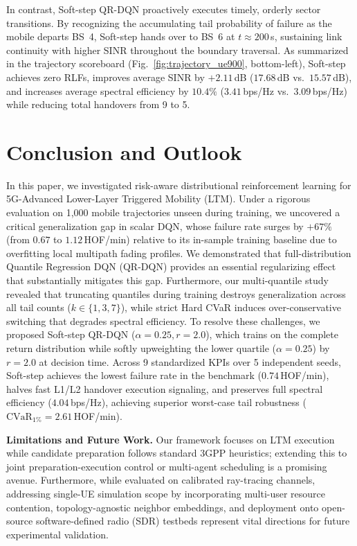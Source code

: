 \documentclass{ieeetmlcn}
\begin{document}
In contrast, Soft-step QR-DQN proactively executes timely, orderly sector transitions. By recognizing the accumulating tail probability of failure as the mobile departs BS~4, Soft-step hands over to BS~6 at $t \approx 200$\,s, sustaining link continuity with higher SINR throughout the boundary traversal. As summarized in the trajectory scoreboard (Fig.~\ref{fig:trajectory_ue900}, bottom-left), Soft-step achieves zero RLFs, improves average SINR by $+2.11$\,dB ($17.68$\,dB vs.\ $15.57$\,dB), and increases average spectral efficiency by $10.4\%$ ($3.41$\,bps/Hz vs.\ $3.09$\,bps/Hz) while reducing total handovers from 9 to 5.



\section{Conclusion and Outlook}
\label{sec:conclusion}
In this paper, we investigated risk-aware distributional reinforcement learning for 5G-Advanced Lower-Layer Triggered Mobility (LTM). Under a rigorous evaluation on 1,000 mobile trajectories unseen during training, we uncovered a critical generalization gap in scalar DQN, whose failure rate surges by $+67\%$ (from $0.67$ to $1.12$\,HOF/min) relative to its in-sample training baseline due to overfitting local multipath fading profiles. We demonstrated that full-distribution Quantile Regression DQN (QR-DQN) provides an essential regularizing effect that substantially mitigates this gap. Furthermore, our multi-quantile study revealed that truncating quantiles during training destroys generalization across all tail counts ($k \in \{1, 3, 7\}$), while strict Hard CVaR induces over-conservative switching that degrades spectral efficiency. To resolve these challenges, we proposed Soft-step QR-DQN ($\alpha=0.25, r=2.0$), which trains on the complete return distribution while softly upweighting the lower quartile ($\alpha=0.25$) by $r=2.0$ at decision time. Across 9 standardized KPIs over 5 independent seeds, Soft-step achieves the lowest failure rate in the benchmark ($0.74$\,HOF/min), halves fast L1/L2 handover execution signaling, and preserves full spectral efficiency ($4.04$\,bps/Hz), achieving superior worst-case tail robustness ($\mathrm{CVaR}_{1\%} = 2.61$\,HOF/min).

\textbf{Limitations and Future Work.} Our framework focuses on LTM execution while candidate preparation follows standard 3GPP heuristics; extending this to joint preparation-execution control or multi-agent scheduling is a promising avenue. Furthermore, while evaluated on calibrated ray-tracing channels, addressing single-UE simulation scope by incorporating multi-user resource contention, topology-agnostic neighbor embeddings, and deployment onto open-source software-defined radio (SDR) testbeds represent vital directions for future experimental validation.
\end{document}

